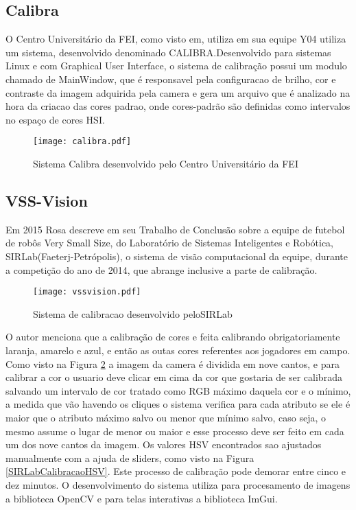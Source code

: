 \subsection{Calibra}
O Centro Universitário da FEI, como visto em\cite{PenharbelTime}, utiliza em sua equipe Y04 utiliza um sistema, desenvolvido denominado CALIBRA\cite{Penharbel:2004}.Desenvolvido para sistemas Linux e com Graphical User Interface\cite{Penharbel:2004}, o sistema de calibração possui um modulo chamado de MainWindow, que é responsavel pela configuracao de brilho, cor e contraste da imagem adquirida pela camera e gera um arquivo que é analizado na hora da criacao das cores padrao\cite{PenharbelTime}, onde cores-padrão são definidas como intervalos no espaço de cores HSI\cite{PenharbelTime}.
\begin{figure}[!h]
	\centering
	\texttt{[image: calibra.pdf]}
	\caption{Sistema Calibra desenvolvido pelo Centro Universitário da FEI \cite{Penharbel:2004}}
	\label{Calibra}
\end{figure}

\subsection{VSS-Vision}

Em 2015 Rosa\cite{Rosa:2015} descreve em seu Trabalho de Conclusão sobre a equipe de futebol de rob\^os Very Small Size, do Laboratório de Sistemas Inteligentes e Robótica, SIRLab(Faeterj-Petrópolis), o sistema de visão computacional da equipe, durante a competição do ano de 2014, que abrange inclusive a parte de calibração. 

\begin{figure}[!h]
	\centering
	\texttt{[image: vssvision.pdf]} 	
	\caption{Sistema de calibracao desenvolvido peloSIRLab \cite{Rosa:2015}}
	\label{SIRLabCalibracao}
\end{figure}
O autor menciona que a calibração de cores e feita calibrando obrigatoriamente laranja, amarelo e azul, e então as outas cores referentes aos jogadores em campo. Como visto na Figura \ref{SIRLabCalibracao} a imagem da camera é dividida em nove cantos, e para calibrar a cor o usuario deve clicar em cima da cor que gostaria de ser calibrada salvando um intervalo de cor tratado como RGB máximo daquela cor e o mínimo, a medida
que vão havendo os cliques o sistema verifica para cada atributo se ele é maior que o atributo
máximo salvo ou menor que mínimo salvo, caso seja, o mesmo assume o lugar de menor ou
maior\cite{Rosa:2015} e esse processo deve ser feito em cada um dos nove cantos da imagem. Os valores HSV encontrados sao ajustados manualmente com a ajuda de sliders, como visto na Figura \ref{SIRLabCalibracaoHSV}. Este processo de calibração pode demorar entre cinco e dez minutos.
O desenvolvimento do sistema utiliza para procesamento de imagens a biblioteca OpenCV e para telas interativas a biblioteca  ImGui.


